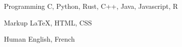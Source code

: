 

\begin{cvskills}

  \cvskill
    {Programming} %
    {C, Python, Rust, C++, Java, Javascript, R} %

  \cvskill
    {Markup} %
    {\LaTeX, HTML, CSS} %

  \cvskill
    {Human} %
    {English, French} %

\end{cvskills}
